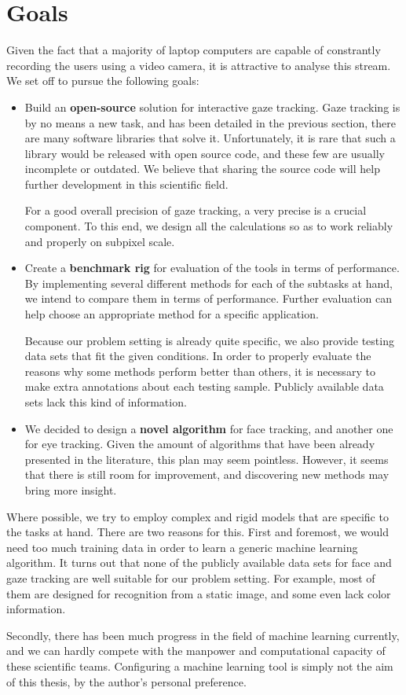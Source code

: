 \chapter{Goals}
\label{s:goals}

Given the fact that a majority of laptop computers are capable of constrantly recording the users using a video camera, it is attractive to analyse this stream.
We set off to pursue the following goals:
\begin{itemize}

\item Build an \textbf{open-source} solution for interactive gaze tracking.
Gaze tracking is by no means a new task, and has been detailed in the previous section, there are many software libraries that solve it.
Unfortunately, it is rare that such a library would be released with open source code, and these few are usually incomplete or outdated.
We believe that sharing the source code will help further development in this scientific field.

For a good overall precision of gaze tracking, a very precise is a crucial component.
To this end, we design all the calculations so as to work reliably and properly on subpixel scale.

\item Create a \textbf{benchmark rig} for evaluation of the tools in terms of performance.
By implementing several different methods for each of the subtasks at hand, we intend to compare them in terms of performance.
Further evaluation can help choose an appropriate method for a specific application.

Because our problem setting is already quite specific, we also provide testing data sets that fit the given conditions.
In order to properly evaluate the reasons why some methods perform better than others, it is necessary to make extra annotations about each testing sample.
Publicly available data sets lack this kind of information.

\item We decided to design a \textbf{novel algorithm} for face tracking, and another one for eye tracking.
Given the amount of algorithms that have been already presented in the literature, this plan may seem pointless.
However, it seems that there is still room for improvement, and discovering new methods may bring more insight.

\end{itemize}

Where possible, we try to employ complex and rigid models that are specific to the tasks at hand.
There are two reasons for this.
First and foremost, we would need too much training data in order to learn a generic machine learning algorithm.
It turns out that none of the publicly available data sets for face and gaze tracking are well suitable for our problem setting.
For example, most of them are designed for recognition from a static image, and some even lack color information.

Secondly, there has been much progress in the field of machine learning currently, and we can hardly compete with the manpower and computational capacity of these scientific teams.
Configuring a machine learning tool is simply not the aim of this thesis, by the author's personal preference.
